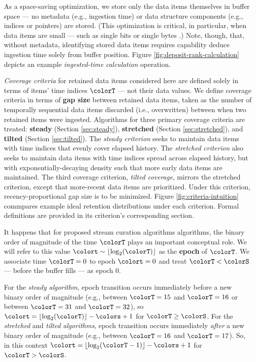 As a space-saving optimization, we store only the data items themselves in buffer space --- no metadata (e.g., ingestion time) or data structure components (e.g., indices or pointers) are stored.
(This optimization is critical, in particular, when data items are small --- such as single bits or single bytes \citep{moreno2022hereditary}.)
Note, though, that, without metadata, identifying stored data items requires capability deduce ingestion time solely from buffer position.
Figure \ref{fig:deposit-rank-calculation} depicts an example \textit{ingested-time calculation} operation.

\textit{Coverage criteria} for retained data items considered here are defined solely in terms of items' time indices $\colorT$ --- not their data values.
We define coverage criteria in terms of \textbf{gap size} between retained data items, taken as the number of temporally sequential data items discarded (i.e., overwritten) between when two retained items were ingested.
Algorithms for three primary coverage criteria are treated: \textbf{steady} (Section \ref{sec:steady}), \textbf{stretched} (Section \ref{sec:stretched}), and \textbf{tilted} (Section \ref{sec:tilted}).
The \textit{steady criterion} seeks to maintain data items with time indices that evenly cover elapsed history.
The \textit{stretched criterion} also seeks to maintain data items with time indices spread across elapsed history, but with exponentially-decaying density such that more early data items are maintained.
The third coverage criterion, \textit{tilted coverage}, mirrors the stretched criterion, except that more-recent data items are prioritized.
Under this criterion, recency-proportional gap size is to be minimized.
Figure \ref{fig:criteria-intuition} commpares example ideal retention distributions under each criterion.
Formal definitions are provided in its criterion's corresponding section.

It happens that for proposed stream curation algorithms algorithms, the binary order of magnitude of the time $\colorT$ plays an important conceptual role.
We will refer to this value $\colort \sim \left\lfloor \log_2(\colorT) \right\rfloor$ as the \textbf{epoch} of $\colorT$.
We associate time $\colorT=0$ to epoch $\colort=0$ and treat $\colorT < \colorS$ --- before the buffer fills --- as epoch 0.

For the \textit{steady algorithm}, epoch transition occurs immediately before a new binary order of magnitude (e.g., between $\colorT = 15$ and $\colorT = 16$ or between $\colorT = 31$ and $\colorT = 32$), so $\colort = \left\lfloor \log_2(\colorT) \right\rfloor - \colors + 1$ for $\colorT \geq \colorS$.
For the \textit{stretched} and \textit{tilted algorithms}, epoch transition occurs immediately \textit{after} a new binary order of magnitude (e.g., between $\colorT = 16$ and $\colorT = 17$).
So, in this context $\colort = \left\lfloor \log_2(\colorT - 1) \right\rfloor - \colors + 1$ for $\colorT > \colorS$.

